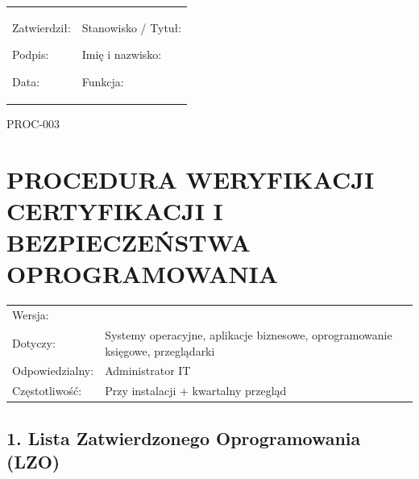 \documentclass[12pt,a4paper]{article}
\begin{document}
\begin{longtable}[]{@{}
  >{\raggedright\arraybackslash}p{}
  >{\raggedright\arraybackslash}p{}@{}}
\toprule\noalign{}
\endhead
\bottomrule\noalign{}
\endlastfoot
\begin{minipage}[t]{\linewidth}\raggedright
Zatwierdził:

Podpis: \underline{\hspace{3cm}}

Data: \underline{\hspace{4cm}}
\end{minipage} & \begin{minipage}[t]{\linewidth}\raggedright
Stanowisko / Tytuł:

Imię i nazwisko: \underline{\hspace{3cm}}

Funkcja: \underline{\hspace{3cm}}
\end{minipage} \\
\end{longtable}

\label{doc3}
PROC-003

\section{PROCEDURA WERYFIKACJI CERTYFIKACJI I BEZPIECZEŃSTWA
OPROGRAMOWANIA}\label{procedura-weryfikacji-certyfikacji-i-bezpieczeux144stwa-oprogramowania}

\begin{longtable}[]{@{}>{\raggedright\arraybackslash}p{}>{\raggedright\arraybackslash}p{}@{}}
\toprule\noalign{}
\endhead
\bottomrule\noalign{}
\endlastfoot
Wersja: & 1.0 \\
Dotyczy: & Systemy operacyjne, aplikacje biznesowe, oprogramowanie
księgowe, przeglądarki \\
Odpowiedzialny: & Administrator IT \\
Częstotliwość: & Przy instalacji + kwartalny przegląd \\
\end{longtable}

\subsection{1. Lista Zatwierdzonego Oprogramowania
(LZO)}\label{lista-zatwierdzonego-oprogramowania-lzo}
\end{document}

